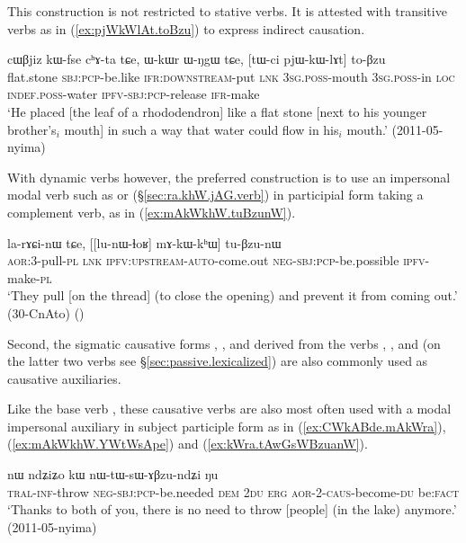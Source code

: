 This construction is not restricted to stative verbs. It is attested with transitive verbs as in  (\ref{ex:pjWkWlAt.toBzu}) to express indirect causation.

\begin{exe}
\ex  \label{ex:pjWkWlAt.toBzu}
\gll  cɯβjiz kɯ-fse cʰɤ-ta tɕe, ɯ-kɯr ɯ-ŋgɯ tɕe, [tɯ-ci pjɯ-kɯ-lɤt] to-βzu \\
flat.stone \textsc{sbj}:\textsc{pcp}-be.like \textsc{ifr}:\textsc{downstream}-put \textsc{lnk} \textsc{3sg}.\textsc{poss}-mouth \textsc{3sg}.\textsc{poss}-in \textsc{loc} \textsc{indef}.\textsc{poss}-water \textsc{ipfv}-\textsc{sbj}:\textsc{pcp}-release \textsc{ifr}-make \\
\glt `He placed [the leaf of a rhododendron] like a flat stone [next to his younger brother's$_i$ mouth] in such a way that water could flow in his$_i$ mouth.' (2011-05-nyima)
\end{exe}

With dynamic verbs however, the preferred construction is to use an impersonal modal verb such as  or   (§\ref{sec:ra.khW.jAG.verb}) in participial form taking a complement verb, as in (\ref{ex:mAkWkhW.tuBzunW}).


\begin{exe}
\ex  \label{ex:mAkWkhW.tuBzunW}
\gll la-rɤɕi-nɯ tɕe, [[lu-nɯ-ɬoʁ] mɤ-kɯ-kʰɯ] tu-βzu-nɯ  \\
\textsc{aor}:3\flobv{}-pull-\textsc{pl} \textsc{lnk} \textsc{ipfv}:\textsc{upstream}-\textsc{auto}-come.out \textsc{neg}-\textsc{sbj}:\textsc{pcp}-be.possible \textsc{ipfv}-make-\textsc{pl} \\
\glt `They pull [on the thread] (to close the opening) and prevent it from coming out.' (30-CnAto)
()
\end{exe}

Second, the sigmatic causative forms , ,  and  derived from the verbs , ,  and  (on the latter two verbs see §\ref{sec:passive.lexicalized}) are also commonly used as causative auxiliaries.

Like the base verb , these causative verbs are also most often used with a modal impersonal auxiliary in subject participle form as in (\ref{ex:CWkABde.mAkWra}), (\ref{ex:mAkWkhW.YWtWsApe}) and (\ref{ex:kWra.tAwGsWBzuanW}).

\begin{exe}
\ex  \label{ex:CWkABde.mAkWra}
\gll [ɕɯ-kɤ-βde mɤ-kɯ-ra] nɯ ndʑiʑo kɯ nɯ-tɯ-sɯ-ɤβzu-ndʑi ŋu  \\
\textsc{tral}-\textsc{inf}-throw  \textsc{neg}-\textsc{sbj}:\textsc{pcp}-be.needed \textsc{dem} \textsc{2du} \textsc{erg} \textsc{aor}-2-\textsc{caus}-become-\textsc{du} be:\textsc{fact} \\
\glt `Thanks to both of you, there is no need to throw [people] (in the lake) anymore.' (2011-05-nyima)
\end{exe}


